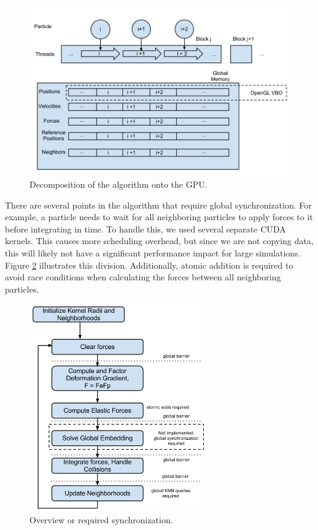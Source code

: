 \documentclass[cameraready]{acmsiggraph-awb}
\begin{document}
\begin{figure}
\begin{centering}
\includegraphics[width = 5in]{Figures/threadDecomp.png}
\caption{Decomposition of the algorithm onto the GPU.}
\label{fig:mapping}
\end{centering}
\end{figure}

There are several points in the algorithm that require global synchronization.  
For example, a particle needs to wait for all neighboring particles to apply forces to it before integrating in time.  
To handle this, we used several separate CUDA kernels.  
This causes more scheduling overhead, but since we are not copying data, this will likely not have a significant performance impact for large simulations.  
Figure \ref{fig:kernelDivision} illustrates this division.  
Additionally, atomic addition is required to avoid race conditions when calculating the forces between all neighboring particles.

\begin{figure}
\begin{centering}
\includegraphics[width = 3in]{Figures/AlgorithmFlowchart.png}
\caption{Overview or required synchronization.}
\label{fig:kernelDivision}
\end{centering}
\end{figure}
\end{document}
